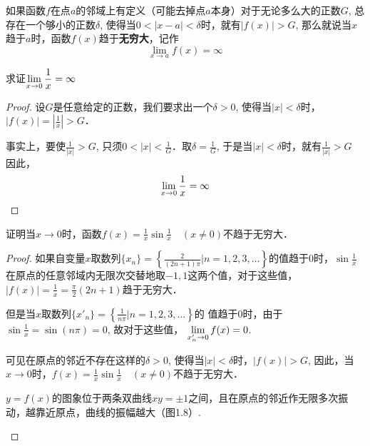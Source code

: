 如果函数$f$在点$a$的邻域上有定义（可能去掉点$a$本身）对于无论多么大的正数$G$, 总存在一个够小的正数$\delta$, 使得当$0<|x-a|<\delta$时，就有$|f(x)|>G$, 那么就说当$x$趋于$a$时，函数$f(x)$趋于\textbf{无穷大}，记作
\[\lim_{x\to a} f (x) =\infty\]

\begin{example}
    求证$\displaystyle\lim_{x\to 0}\dfrac{1}{x}=\infty$
\end{example}
   
\begin{proof}
设$G$是任意给定的正数，我们要求出一个$\delta>0$, 使得当$|x|<\delta$时，$|f(x)|=\left|\frac{1}{x}\right|>G$．

事实上，要使$\frac{1}{|x|}>G$, 
只须$0<|x|<\frac{1}{G} $．取$\delta=\frac{1}{G}$, 于是当$|x|<\delta$时，就有$\frac{1}{|x|}>G$
因此，
$$\displaystyle\lim_{x\to 0}\dfrac{1}{x}=\infty$$
\end{proof}

\begin{example}
    证明当$x\to 0$时，函数$f(x)=\frac{1}{x}\sin\frac{1}{x}\quad (x\ne 0)$不趋于无穷大．
\end{example}

\begin{proof}
如果自变量$x$取数列$\{x_n\}=\left\{\frac{2}{(2n+1)\pi}\Big|n=1, 2, 3,\ldots\right\}$的值趋于0时，$\sin\frac{1}{x}$在原点的任意邻域内无限次交替地取$-1, 1$这两个值，对于这些值，$|f(x)|=\frac{1}{x}=\frac{\pi}{2}(2n+1)$趋于无穷大．

但是当$x$取数列$\{x'_n\}=\left\{\frac{1}{n\pi}\Big| n=1, 2, 3,\ldots\right\}$的
值趋于0时，由于
$\sin\frac{1}{x}=\sin (n\pi) =0$, 
故对于这些值，
$\displaystyle\lim_{x'_n\to 0} f (x) =0$.

可见在原点的邻近不存在这样的$\delta>0$, 使得当$|x|<\delta$时，$|f(x)|>G$, 因此，当$x\to 0$时，$f(x)=\frac{1}{x}\sin\frac{1}{x}\quad (x\ne 0)$不趋于无穷大．

$y=f(x)$的图象位于两条双曲线$xy=\pm 1$之间，且在原点的邻近作无限多次振动，越靠近原点，曲线的振幅越大（图1.8）.

\begin{figure}[htp]
    \centering
{}
    \caption{}
\end{figure}

\end{proof}

